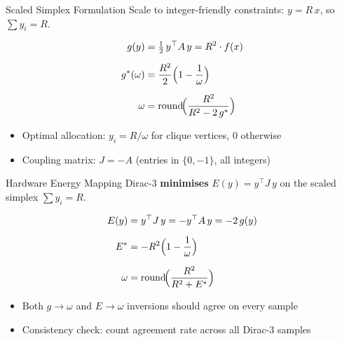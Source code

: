 \documentclass[aspectratio=169]{beamer}
\begin{document}

\begin{frame}{Scaled Simplex Formulation}
    Scale to integer-friendly constraints: $y = R\,x$, so $\sum y_i = R$.

    \begin{align*}
        g(y) &= \tfrac{1}{2}\, y^\top A\, y = R^2 \cdot f(x) \\[6pt]
        g^*(\omega) &= \frac{R^2}{2}\Bigl(1 - \frac{1}{\omega}\Bigr) \\[6pt]
        \omega &= \operatorname{round}\!\Bigl(\frac{R^2}{R^2 - 2\,g^*}\Bigr)
    \end{align*}

    \vspace{0.5em}
    \begin{itemize}
        \item Optimal allocation: $y_i = R/\omega$ for clique vertices, $0$ otherwise
        \item Coupling matrix: $J = -A$ (entries in $\{0, -1\}$, all integers)
    \end{itemize}
\end{frame}


\begin{frame}{Hardware Energy Mapping}
    Dirac-3 \textbf{minimises} $E(y) = y^\top J\, y$ on the scaled simplex $\sum y_i = R$.

    \begin{align*}
        E(y) &= y^\top J\, y = -y^\top A\, y = -2\,g(y) \\[6pt]
        E^* &= -R^2\Bigl(1 - \frac{1}{\omega}\Bigr) \\[6pt]
        \omega &= \operatorname{round}\!\Bigl(\frac{R^2}{R^2 + E^*}\Bigr)
    \end{align*}

    \vspace{0.5em}
    \begin{itemize}
        \item Both $g \to \omega$ and $E \to \omega$ inversions should agree on every sample
        \item Consistency check: count agreement rate across all Dirac-3 samples
    \end{itemize}
\end{frame}

\end{document}
